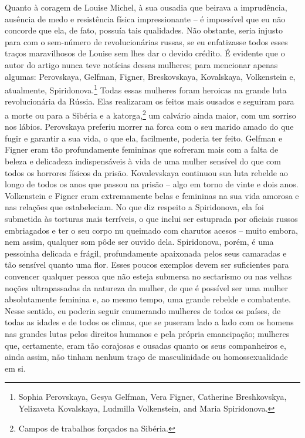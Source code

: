 Quanto à coragem de Louise Michel, à sua ousadia que beirava a
imprudência, ausência de medo e resistência física impressionante -- é
impossível que eu não concorde que ela, de fato, possuía tais
qualidades. Não obstante, seria injusto para com o sem-número de
revolucionárias russas, se eu enfatizasse todos esses traços
maravilhosos de Louise sem lhes dar o devido crédito. É evidente que o
autor do artigo nunca teve notícias dessas mulheres; para mencionar
apenas algumas: Perovskaya, Gelfman, Figner, Breskovskaya, Kovalskaya,
Volkenstein e, atualmente, Spiridonova.\footnote{Sophia Perovskaya,
  Gesya Gelfman, Vera Figner, Catherine Breshkovskya, Yelizaveta
  Kovalskaya, Ludmilla Volkenstein, and Maria Spiridonova.} Todas essas
mulheres foram heroicas na grande luta revolucionária da Rússia. Elas
realizaram os feitos mais ousados ​​e seguiram para a morte ou para a
Sibéria e a katorga,\footnote{Campos de trabalhos forçados na Sibéria.}
um calvário ainda maior, com um sorriso nos lábios. Perovskaya preferiu
morrer na forca com o seu marido amado do que fugir e garantir a sua
vida, o que ela, facilmente, poderia ter feito. Gelfman e Figner eram
tão profundamente femininas que sofreram mais com a falta de beleza e
delicadeza indispensáveis à vida de uma mulher sensível do que com todos
os horrores físicos da prisão. Kovalevskaya continuou sua luta rebelde
ao longo de todos os anos que passou na prisão -- algo em torno de vinte
e dois anos. Volkenstein e Figner eram extremamente belas e femininas na
sua vida amorosa e nas relações que estabeleciam. No que diz respeito a
Spiridonova, ela foi submetida às torturas mais terríveis, o que inclui
ser estuprada por oficiais russos embriagados e ter o seu corpo nu
queimado com charutos acesos -- muito embora, nem assim, qualquer som
pôde ser ouvido dela. Spiridonova, porém, é uma pessoinha delicada e
frágil, profundamente apaixonada pelos seus camaradas e tão sensível
quanto uma flor. Esses poucos exemplos devem ser suficientes para
convencer qualquer pessoa que não esteja submersa no sectarismo ou nas
velhas noções ultrapassadas da natureza da mulher, de que é possível ser
uma mulher absolutamente feminina e, ao mesmo tempo, uma grande rebelde
e combatente. Nesse sentido, eu poderia seguir enumerando mulheres de
todos os países, de todas as idades e de todos os climas, que se puseram
lado a lado com os homens nas grandes lutas pelos direitos humanos e
pela própria emancipação; mulheres que, certamente, eram tão corajosas e
ousadas quanto os seus companheiros e, ainda assim, não tinham nenhum
traço de masculinidade ou homossexualidade em si.

